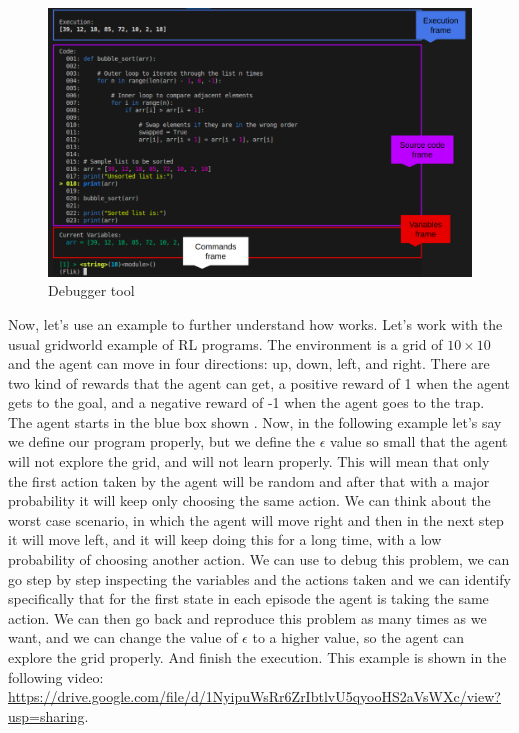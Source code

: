 \begin{figure}[h]
    \centering
    \includegraphics[width=1\textwidth]{figures/flik_interface.png}
    \caption{Debugger tool}
    \label{fig:debuggerf}
\end{figure}

Now, let's use an example to further understand how \flik works. Let's work with 
the usual gridworld example of \ac{RL} programs. The environment is a grid of 
$10 \times 10$ and the agent can move in four directions: up, down, left, and right.
There are two kind of rewards that the agent can get, a positive reward of 1 when 
the agent gets to the goal, and a negative reward of -1 when the agent goes to the 
trap. The agent starts in the blue box shown . Now, in the following
example let's say we define our program properly, but we define the $\epsilon$ value 
so small that the agent will not explore the grid, and will not learn properly. 
This will mean that only the first action taken by the agent will be random and after that
with a major probability it will keep only choosing the same action. We can think about 
the worst case scenario, in which the agent will move right and then in the next step it 
will move left, and it will keep doing this for a long time, with a low probability of 
choosing another action. We can use \flik to debug this problem, we can go step by step
inspecting the variables and the actions taken and we can identify specifically that for 
the first state in each episode the agent is taking the same action. We can then go back and
reproduce this problem as many times as we want, and we can change the value of $\epsilon$
to a higher value, so the agent can explore the grid properly. And finish the execution.
This example is shown in the following video: \url{https://drive.google.com/file/d/1NyipuWsRr6ZrIbtlvU5qyooHS2aVsWXc/view?usp=sharing}.



\endinput

